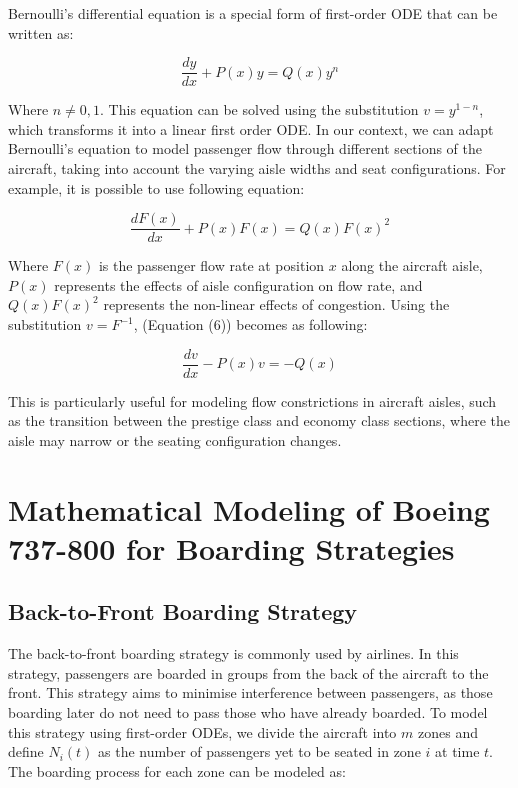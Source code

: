 \documentclass[12pt]{article}
\begin{document}
Bernoulli's differential equation is a special form of first-order ODE that can be written as:

\begin{equation}
\frac{dy}{dx} + P(x)y = Q(x)y^n
\end{equation}

Where $n \neq 0, 1$. This equation can be solved using the substitution $v = y^{1-n}$, which transforms it into a linear first order ODE. In our context, we can adapt Bernoulli's equation to model passenger flow through different sections of the aircraft, taking into account the varying aisle widths and seat configurations. For example, it is possible to use following equation:

\begin{equation}
\frac{dF(x)}{dx} + P(x)F(x) = Q(x)F(x)^2
\end{equation}

Where $F(x)$ is the passenger flow rate at position $x$ along the aircraft aisle, $P(x)$ represents the effects of aisle configuration on flow rate, and $Q(x)F(x)^2$ represents the non-linear effects of congestion. Using the substitution $v = F^{-1}$, (Equation (6)) becomes as following:

\begin{equation}
\frac{dv}{dx} - P(x)v = -Q(x)
\end{equation}

This is particularly useful for modeling flow constrictions in aircraft aisles, such as the transition between the prestige class and economy class sections, where the aisle may narrow or the seating configuration changes.

\section{Mathematical Modeling of Boeing 737-800 for Boarding Strategies}
\subsection{Back-to-Front Boarding Strategy}

The back-to-front boarding strategy is commonly used by airlines. In this strategy, passengers are boarded in groups from the back of the aircraft to the front. This strategy aims to minimise interference between passengers, as those boarding later do not need to pass those who have already boarded. To model this strategy using first-order ODEs, we divide the aircraft into $m$ zones and define $N_i(t)$ as the number of passengers yet to be seated in zone $i$ at time $t$. The boarding process for each zone can be modeled as:
\end{document}
